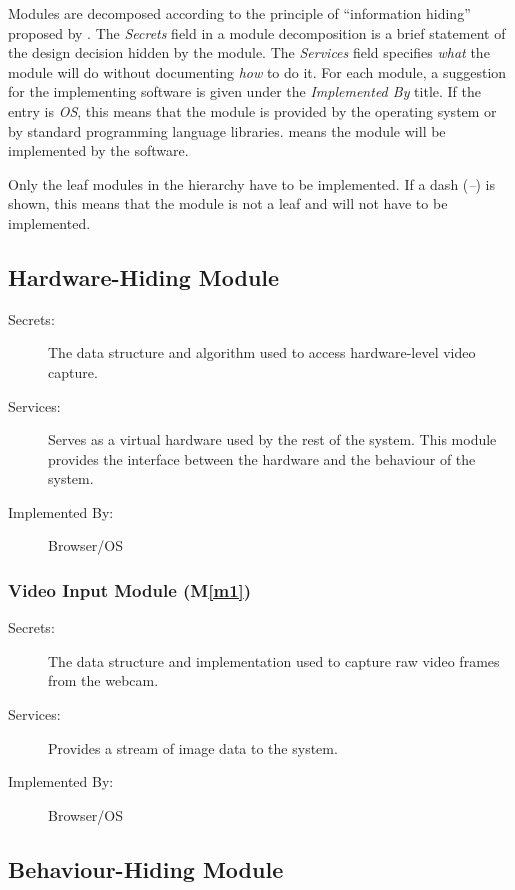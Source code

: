 \documentclass[12pt, titlepage]{article}
\newcommand{\mref}[1]{M\ref{#1}}
\begin{document}
Modules are decomposed according to the principle of ``information hiding''
proposed by \citet{ParnasEtAl1984}. The \emph{Secrets} field in a module
decomposition is a brief statement of the design decision hidden by the
module. The \emph{Services} field specifies \emph{what} the module will do
without documenting \emph{how} to do it. For each module, a suggestion for the
implementing software is given under the \emph{Implemented By} title. If the
entry is \emph{OS}, this means that the module is provided by the operating
system or by standard programming language libraries.  \emph{\progname{}} means the
module will be implemented by the \progname{} software.

Only the leaf modules in the hierarchy have to be implemented. If a dash
(\emph{--}) is shown, this means that the module is not a leaf and will not have
to be implemented.

\subsection{Hardware-Hiding Module}

\begin{description}
\item[Secrets:] The data structure and algorithm used to access hardware-level
  video capture.
\item[Services:] Serves as a virtual hardware used by the rest of the system.
  This module provides the interface between the hardware and the behaviour of
  the system.
\item[Implemented By:] Browser/OS
\end{description}

\subsubsection{Video Input Module (\mref{m1})}
\begin{description}
\item[Secrets:] The data structure and implementation used to capture raw video frames from the webcam.
\item[Services:] Provides a stream of image data to the system.
\item[Implemented By:] Browser/OS
\end{description}

\subsection{Behaviour-Hiding Module}
\end{document}
